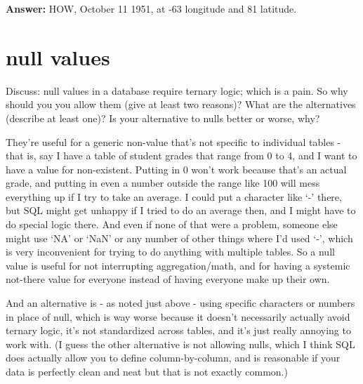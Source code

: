 \documentclass[11pt, oneside]{amsart}   	%
\begin{document}
\textbf{Answer: } HOW, October 11 1951, at -63 longitude and 81 latitude.  


\section{null values}
Discuss: null values in a database require ternary logic; which is a pain. So why should you you allow them (give at least two reasons)? What are the alternatives (describe at least one)? Is your alternative to nulls better or worse, why? 

They're useful for a generic non-value that's not specific to individual tables - that is, say I have a table of student grades that range from 0 to 4, and I want to have a value for non-existent. Putting in 0 won't work because that's an actual grade, and putting in even a number outside the range like 100 will mess everything up if I try to take an average. I could put a character like `-' there, but SQL might get unhappy if I tried to do an average then, and I might have to do special logic there. And even if none of that were a problem, someone else might use `NA' or `NaN' or any number of other things where I'd used `-', which is very inconvenient for trying to do anything with multiple tables. So a null value is useful for not interrupting aggregation/math, and for having a systemic not-there value for everyone instead of having everyone make up their own. 

And an alternative is - as noted just above - using specific characters or numbers in place of null, which is way worse because it doesn't necessarily actually avoid ternary logic, it's not standardized across tables, and it's just really annoying to work with. (I guess the other alternative is not allowing nulls, which I think SQL does actually allow you to define column-by-column, and is reasonable if your data is perfectly clean and neat but that is not exactly common.) 
\end{document}
